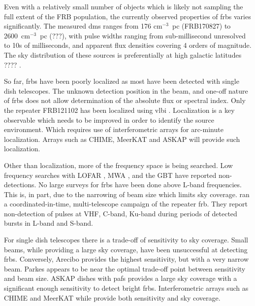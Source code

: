 \documentclass[a4paper,fleqn,usenatbib]{mnras}
\begin{document}
Even with a relatively small number of objects which is likely not sampling the full extent of the FRB population, the currently observed properties of \glspl{frb} varies significantly.
The measured \glspl{dm} ranges from 176 cm$^{-3}$~pc (FRB170827) to 2600~cm$^{-3}$~pc (???), with
pulse widths ranging from sub-millisecond unresolved to 10s of milliseconds,
and apparent flux densities covering 4 orders of magnitude. The sky distribution
of these sources is preferentially at high galactic latitudes ????
\citep{2015MNRAS.451.3278M}.

So far, \glspl{frb} have been poorly localized as most have been detected with
single dish telescopes. The unknown detection position in the beam, and one-off
nature of \glspl{frb} does not allow determination of the absolute flux or
spectral index. Only the repeater FRB121102 has been localized using \gls{vlbi}
\citep{2017ApJ...834L...8M, 2017ApJ...834L...7T}. Localization is a key
observable which needs to be improved in order to identify the source
environment. Which requires use of interferometric arrays for arc-minute
localization. Arrays such as CHIME, MeerKAT and ASKAP will provide such
localization.

Other than localization, more of the frequency space is being searched. Low
frequency searches with LOFAR \citep{2015MNRAS.452.1254K}, MWA
\citep{2015AJ....150..199T}, and the GBT \citep{2017arXiv170107457C} have
reported non-detections.  No large surveys for \glspl{frb} have been done above
L-band frequencies. This is, in part, due to the narrowing of beam size which
limits sky coverage.  \cite{2017arXiv170507553L} ran a coordinated-in-time,
multi-telescope campaign of the repeater \gls{frb}.  They report non-detection
of pulses at VHF, C-band, Ku-band during periods of detected bursts in L-band
and S-band.

For single dish telescopes there is a trade-off of sensitivity to sky coverage.
Small beams, while providing a large sky coverage, have been unsuccessful at
detecting \glspl{frb}. Conversely, Arecibo provides the highest sensitivity, but
with a very narrow beam. Parkes appears to be near the optimal trade-off point
between sensitivity and beam size.  ASKAP dishes with \glspl{paf} provides a
large sky coverage with a significant enough sensitivity to detect bright
\glspl{frb}. Interferometric arrays such as CHIME and MeerKAT while provide both
sensitivity and sky coverage.
\end{document}
